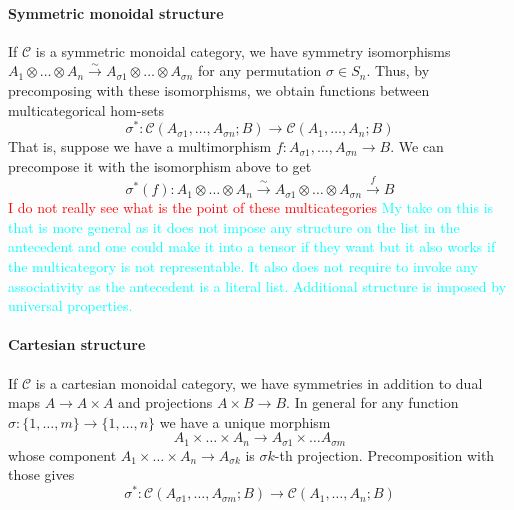 \documentclass[acmsmall,screen, nonacm, anonymous]{acmart}
\begin{document}
\paragraph*{Symmetric monoidal structure} If $\mathcal{C}$ is a symmetric monoidal category, we have symmetry isomorphisms $A_1 \otimes \ldots \otimes A_n \xrightarrow{\sim} A_{\sigma 1} \otimes \ldots \otimes A_{\sigma n}$ for any permutation $\sigma \in S_{n}$.
Thus, by precomposing with these isomorphisms, we obtain functions between multicategorical hom-sets
\[
\sigma^* : \mathcal{C}(A_{\sigma 1}, \ldots, A_{\sigma n}; B) \to \mathcal{C}(A_1,\ldots,A_n;B)
\]
That is, suppose we have a multimorphism $f : A_{\sigma 1}, \ldots, A_{\sigma n} \to B$. We can precompose it with the isomorphism above to get
\[
\sigma^{*}(f) : A_1 \otimes \ldots \otimes A_n \xrightarrow{\sim} A_{\sigma 1} \otimes \ldots \otimes A_{\sigma n} \xrightarrow{f} B
\]
\textcolor{red}{I do not really see what is the point of these multicategories}
\textcolor{cyan}{My take on this is that is more general as it does not impose any structure on the list in the antecedent and one could make it into a tensor if they want but it also works if the multicategory is not representable.
It also does not require to invoke any associativity as the antecedent is a literal list.
Additional structure is imposed by universal properties.
}
\paragraph*{Cartesian structure} If $\mathcal{C}$ is a cartesian monoidal category, we have symmetries in addition to dual maps $A \to A \times A$ and projections $A \times B \to B$.
In general for any function $\sigma : \{1, \ldots, m\} \to \{1, \ldots, n\}$ we have a unique morphism
\[
A_1 \times \ldots \times A_n \to A_{\sigma 1} \times \ldots A_{\sigma m}
\]
whose component $A_1 \times \ldots \times A_n \to A_{\sigma k}$ is $\sigma k$-th projection.
Precomposition with those gives
\[
\sigma^{*} : \mathcal{C}(A_{\sigma 1}, \ldots, A_{\sigma m}; B) \to \mathcal{C}(A_{1}, \ldots, A_n; B)
\] 
\end{document}
